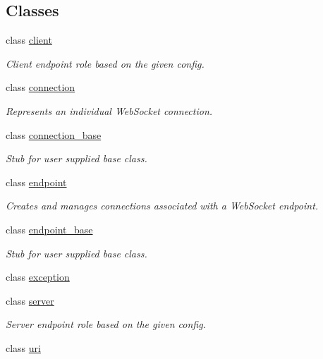 \subsection*{Classes}
\begin{DoxyCompactItemize}
\item 
class \hyperlink{classwebsocketpp_1_1client}{client}
\begin{DoxyCompactList}\small\item\em Client endpoint role based on the given config. \end{DoxyCompactList}\item 
class \hyperlink{classwebsocketpp_1_1connection}{connection}
\begin{DoxyCompactList}\small\item\em Represents an individual Web\+Socket connection. \end{DoxyCompactList}\item 
class \hyperlink{classwebsocketpp_1_1connection__base}{connection\+\_\+base}
\begin{DoxyCompactList}\small\item\em Stub for user supplied base class. \end{DoxyCompactList}\item 
class \hyperlink{classwebsocketpp_1_1endpoint}{endpoint}
\begin{DoxyCompactList}\small\item\em Creates and manages connections associated with a Web\+Socket endpoint. \end{DoxyCompactList}\item 
class \hyperlink{classwebsocketpp_1_1endpoint__base}{endpoint\+\_\+base}
\begin{DoxyCompactList}\small\item\em Stub for user supplied base class. \end{DoxyCompactList}\item 
class \hyperlink{classwebsocketpp_1_1exception}{exception}
\item 
class \hyperlink{classwebsocketpp_1_1server}{server}
\begin{DoxyCompactList}\small\item\em Server endpoint role based on the given config. \end{DoxyCompactList}\item 
class \hyperlink{classwebsocketpp_1_1uri}{uri}
\end{DoxyCompactItemize}
